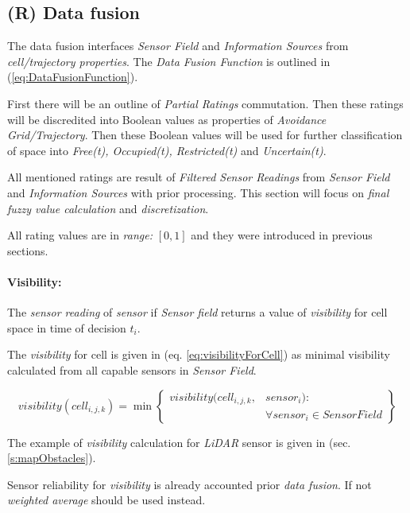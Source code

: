 \subsection{(R) Data fusion}\label{s:sensorFusion}

\noindent The data fusion interfaces \emph{Sensor Field} and \emph{Information Sources} from \emph{cell/trajectory properties}. The \emph{Data Fusion Function} is outlined in (\ref{eq:DataFusionFunction}). 

First there will be an outline of \emph{Partial Ratings} commutation. Then these ratings will be discredited into Boolean values as properties of \emph{Avoidance Grid/Trajectory}. Then these Boolean values will be used for further classification of  space into \emph{Free(t), Occupied(t), Restricted(t)} and \emph{Uncertain(t)}.

All mentioned ratings are result of \emph{Filtered Sensor Readings} from \emph{Sensor Field} and \emph{Information Sources} with prior processing. This section will focus on \emph{final fuzzy value calculation} and \emph{discretization}. 
\begin{note}
    All rating values are in \emph{range:} $[0,1]$ and they were introduced in previous sections.
\end{note}


\paragraph{Visibility:} The \emph{sensor reading} of \emph{sensor} if \emph{Sensor field} returns a value of \emph{visibility} for cell space in time of decision $t_i$.

The \emph{visibility} for cell is given in (eq. \ref{eq:visibilityForCell}) as minimal visibility calculated from all capable sensors in \emph{Sensor Field}.

\begin{equation}\label{eq:visibilityForCell}
    visibility(cell_{i,j,k}) = \min \left\{\begin{aligned}visibility(cell_{i,j,k},&sensor_i):\\&\forall sensor_i \in Sensor Field\end{aligned}\right\}
\end{equation}

\noindent The example of \emph{visibility} calculation for \emph{LiDAR} sensor is given in (sec. \ref{s:mapObstacles}).

\begin{note}
    Sensor reliability for \emph{visibility} is already accounted prior \emph{data fusion}. If not \emph{weighted average} should be used instead. 
\end{note}

